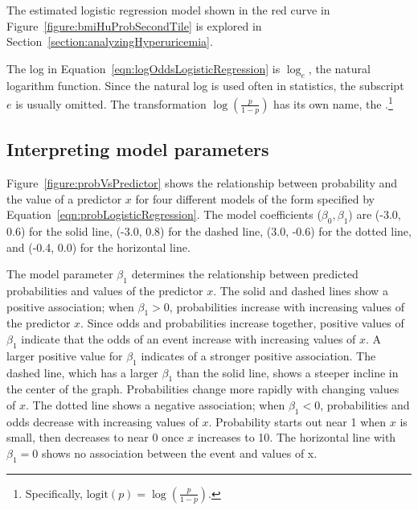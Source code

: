 The estimated logistic regression model shown in the red curve in Figure~\ref{figure:bmiHuProbSecondTile} is explored in Section~\ref{section:analyzingHyperuricemia}.

The log in Equation~\ref{eqn:logOddsLogisticRegression} is $\log_e$, the natural logarithm function.  Since the natural log is used often in statistics, the subscript $e$ is usually omitted. The transformation $\log(\frac{p}{1-p})$ has its own name, the .\footnote{Specifically, $\text{logit}(p) = \log(\frac{p}{1-p})$.}

\newpage
\subsection{Interpreting model parameters}

Figure~\ref{figure:probVsPredictor} shows the relationship between probability and the value of a predictor $x$ for four different models of the form specified by Equation~\ref{eqn:probLogisticRegression}. The model coefficients ($\beta_0, \beta_1$) are (-3.0, 0.6) for the solid line, (-3.0, 0.8) for the dashed line, (3.0, -0.6) for the dotted line, and (-0.4, 0.0) for the horizontal line.

The model parameter $\beta_1$ determines the relationship between predicted probabilities and values of the predictor $x$. The solid and dashed lines show a positive association; when $\beta_1 > 0$, probabilities increase with increasing values of the predictor $x$. Since odds and probabilities increase together, positive values of $\beta_1$ indicate that the odds of an event increase with increasing values of $x$. A larger positive value for $\beta_1$ indicates of a stronger positive association. The dashed line, which has a larger $\beta_1$ than the solid line, shows a steeper incline in the center of the graph. Probabilities change more rapidly with changing values of $x$. The dotted line shows a negative association; when $\beta_1 < 0$, probabilities and odds decrease with increasing values of $x$. Probability starts out near 1 when $x$ is small, then decreases to near 0 once $x$ increases to 10. The horizontal line with $\beta_1 = 0$ shows no association between the event and values of x.


